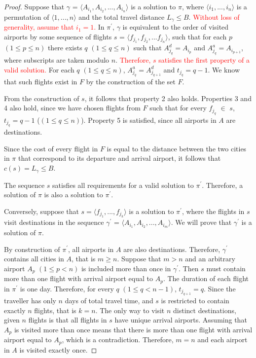 \documentclass{mprop}
\theoremstyle{definition}
\begin{document}
\begin{proof}
Suppose that $\gamma$ = $ \langle A_{i_{1}}, A_{i_{2}},...,A_{i_{n}} \rangle $ is a solution to $\pi$, where $\langle i_{1},...,i_{n} \rangle$ is a permutation of $\langle 1,...,n \rangle $ and the total travel distance $L_{\gamma} \leq B$. \textcolor{red}{Without loss of generality, assume that $i_{1} = 1$.} In $\pi^{\prime}$, $\gamma$ is equivalent to the order of visited airports by some sequence of flights $s$ = $ \langle f_{j_{1}}, f_{j_{2}},...f_{j_{n}} \rangle $, such that for each $p$  $(1 \leq p \leq n)$ there exists $q$ $(1 \leq q \leq n)$ such that $A^{d}_{j_{q}} = A_{i_{p}}$ and $A^{a}_{j_{q}} = A_{i_{p+1}}$, where subscripts are taken modulo $n$. \textcolor{red}{Therefore, $s$ satisfies the first property of a valid solution.} For each $q$ $(1 \leq q \leq n)$, $A^{a}_{j_{q}} = A^{d}_{j_{q+1}}$ and $t_{j_{q}} = q - 1$.  We know that such flights exist in $F$ by the construction of the set $F$.

From the construction of $s$, it follows that property 2 also holds. Properties 3 and 4 also hold, since we have chosen flights from $F$ such that for every $f_{j_{q}}$ $\in$ $s$, $t_{j_{q}} = q - 1$ ($(1 \leq q \leq n)$). Property 5 is satisfied, since all airports in $A$ are destinations.

Since the cost of every flight in $F$ is equal to the distance between the two cities in $\pi$ that correspond to its departure and arrival airport, it follows that $c(s) = L_{\gamma} \leq B$.

The sequence $s$ satisfies all requirements for a valid solution to $\pi^{\prime}$. Therefore, a solution of $\pi$ is also a solution to $\pi^{\prime}$.

Conversely, suppose that $s = \langle f_{j_{1}},...,f_{j_{k}} \rangle $ is a solution to $\pi^{\prime}$, where the flights in $s$ visit destinations in the sequence $\gamma^{\prime}$ = $\langle A_{i_{1}}, A_{i_{2}},...,A_{i_{m}} \rangle$. We will prove that $\gamma^{\prime}$ is a solution of $\pi$.

By construction of $\pi^{\prime}$, all airports in $A$ are also destinations. Therefore, $\gamma^{\prime}$ contains all cities in $A$, that is $m \geq n$. Suppose that $m > n$ and an arbitrary airport $A_{p}$ $(1 \leq p < n)$ is included more than once in $\gamma^{\prime}$. Then $s$ must contain more than one flight with arrival airport equal to $A_{p}$. 
The duration of each flight in $\pi^{\prime}$ is one day. Therefore, for every $q$ $(1 \leq q < n - 1)$, $t_{j_{q+1}} = q$. Since the traveller has only $n$ days of total travel time, and $s$ is restricted to contain exactly $n$ flights, that is $k = n$. The only way to visit $n$ distinct destinations, given $n$ flights is that all flights in $s$ have unique arrival airports. Assuming that $A_{p}$ is visited more than once means that there is more than one flight with arrival airport equal to $A_{p}$, which is a contradiction. Therefore, $m = n$ and each airport in $A$ is visited exactly once.


\end{proof}
\end{document}
